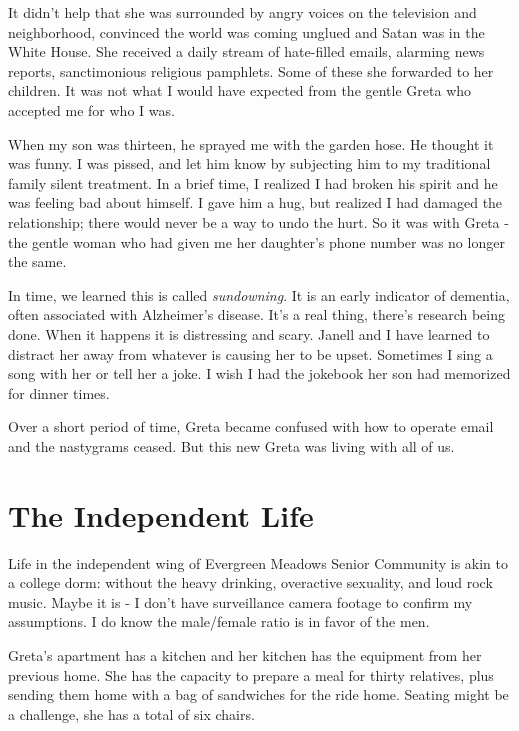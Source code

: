 \documentclass[
  letterpaper,
  DIV=11,
  numbers=noendperiod]{scrreprt}
\begin{document}
It didn't help that she was surrounded by angry voices on the television
and neighborhood, convinced the world was coming unglued and Satan was
in the White House. She received a daily stream of hate-filled emails,
alarming news reports, sanctimonious religious pamphlets. Some of these
she forwarded to her children. It was not what I would have expected
from the gentle Greta who accepted me for who I was.

When my son was thirteen, he sprayed me with the garden hose. He thought
it was funny. I was pissed, and let him know by subjecting him to my
traditional family silent treatment. In a brief time, I realized I had
broken his spirit and he was feeling bad about himself. I gave him a
hug, but realized I had damaged the relationship; there would never be a
way to undo the hurt. So it was with Greta - the gentle woman who had
given me her daughter's phone number was no longer the same.

In time, we learned this is called \emph{sundowning}. It is an early
indicator of dementia, often associated with Alzheimer's disease. It's a
real thing, there's research being done. When it happens it is
distressing and scary. Janell and I have learned to distract her away
from whatever is causing her to be upset. Sometimes I sing a song with
her or tell her a joke. I wish I had the jokebook her son had memorized
for dinner times.

Over a short period of time, Greta became confused with how to operate
email and the nastygrams ceased. But this new Greta was living with all
of us.


\chapter*{The Independent Life}\label{the-independent-life}


Life in the independent wing of Evergreen Meadows Senior Community is
akin to a college dorm: without the heavy drinking, overactive
sexuality, and loud rock music. Maybe it is - I don't have surveillance
camera footage to confirm my assumptions. I do know the male/female
ratio is in favor of the men.

Greta's apartment has a kitchen and her kitchen has the equipment from
her previous home. She has the capacity to prepare a meal for thirty
relatives, plus sending them home with a bag of sandwiches for the ride
home. Seating might be a challenge, she has a total of six chairs.
\end{document}

